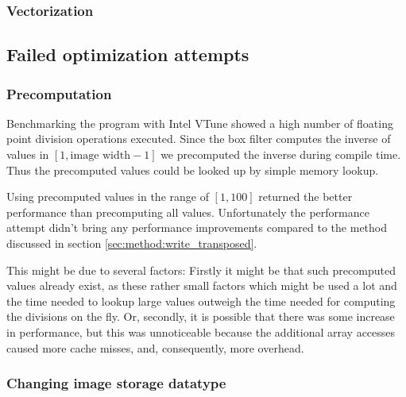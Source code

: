 \subsubsection{Vectorization}

\subsection{Failed optimization attempts}

\subsubsection{Precomputation} 

Benchmarking the program with Intel VTune showed a high number of floating point division operations executed. Since the box filter computes the inverse of values in $[1,\text{image width}-1]$ we precomputed the inverse during compile time. Thus the precomputed values could be looked up by simple memory lookup. 

Using precomputed values in the range of $[1,100]$ returned the better performance than precomputing all values. Unfortunately the performance attempt didn't bring any performance improvements compared to the method discussed in section \ref{sec:method:write_transposed}.

%
%

This might be due to several factors:
Firstly it might be that such precomputed values already exist, as these rather small factors which might be used a lot and the time needed to lookup large values outweigh the time needed for computing the divisions on the fly. Or, secondly, it is possible that there was some increase in performance, but this was unnoticeable because the additional array accesses caused more cache misses, and, consequently, more overhead.

\subsubsection{Changing image storage datatype}

